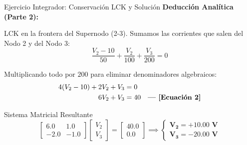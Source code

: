 \documentclass[aspectratio=169, 10pt]{beamer}
\begin{document}
\begin{frame}{Ejercicio Integrador: Conservación LCK y Solución}
    \textbf{Deducción Analítica (Parte 2):}
    
    LCK en la frontera del Supernodo (2-3). Sumamos las corrientes que salen del Nodo 2 y del Nodo 3:
    \begin{equation*}
        \frac{V_2 - 10}{50} + \frac{V_2}{100} + \frac{V_3}{200} = 0
    \end{equation*}
    
    Multiplicando todo por $200$ para eliminar denominadores algebraicos:
    \begin{align*}
        4(V_2 - 10) + 2 V_2 + V_3 &= 0 \\
        6 V_2 + V_3 &= 40 \quad \text{\textbf{--- [Ecuación 2]}}
    \end{align*}
    
    \vspace{0.1cm}
    \begin{alertblock}{Sistema Matricial Resultante}
        $$
        \begin{bmatrix} 6.0 & 1.0 \\ -2.0 & -1.0 \end{bmatrix} \begin{bmatrix} V_2 \\ V_3 \end{bmatrix} = \begin{bmatrix} 40.0 \\ 0.0 \end{bmatrix} \implies \begin{cases} \mathbf{V_2 = +10.00\text{ V}} \\ \mathbf{V_3 = -20.00\text{ V}} \end{cases}
        $$
    \end{alertblock}
\end{frame}
\end{document}

